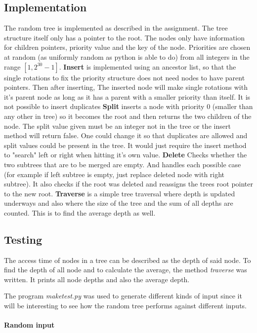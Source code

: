 \documentclass[12pt, a4paper]{article}
\begin{document}
\subsection*{Implementation}
The random tree is implemented as described in the assignment. 
The tree structure itself only has a pointer to the root.
The nodes only have information for children pointers, priority value 
and the key of the node.
Priorities are chosen at random (as uniformly random as python is able to do)
from all integers in the range $[1,2^30-1]$.
\textbf{Insert} is implemented using an ancestor list, so that the single
rotations to fix the priority structure does not need nodes to have parent pointers.
Then after inserting, The inserted node will make single rotations with
it's parent node as long as it has a parent with a smaller priority than itself.
It is not possible to insert duplicates
\textbf{Split} inserts a node with priority 0 (smaller than any other in tree)
so it becomes the root and then returns the two children of the node.
The split value given must be an integer not in the tree or the insert method will return false.
One could change it so that duplicates are allowed and split values could 
be present in the tree. It would just require the insert method to "search" left or right when hitting it's own value.
\textbf{Delete} Checks whether the two subtrees that are to be merged are empty. And handles each possible case (for example if left subtree is empty, just 
replace deleted node with right subtree). 
It also checks if the root was deleted and reassigns the trees root pointer to
the new root.
\textbf{Traverse} is a simple tree traversal where depth is updated underways
and also where the size of the tree and the sum of all depths are counted. 
This is to find the average depth as well. 


\subsection*{Testing}
The access time of nodes in a tree can be described as the depth of said node.
To find the depth of all node and to calculate the average, the method
{\it traverse} was written. It prints all node depths and also the average depth.

The program {\it maketest.py} was used to generate different kinds of input 
since it will be interesting to see how the random tree performs against 
different inputs.
\paragraph{Random input}
\end{document}

